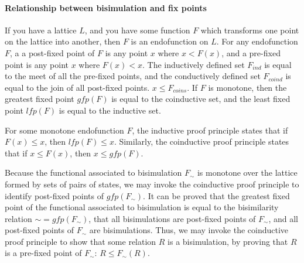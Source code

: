 \paragraph{Relationship between bisimulation and fix points}

If you have a lattice $L$, and you have some 
function $F$ which transforms one point on the lattice into another, then
$F$ is an endofunction on $L$. For any endofunction $F$, a 
a post-fixed point of $F$ is any point $x$ where $x < F(x)$, and a pre-fixed 
point is any point $x$ where $F(x) < x$. The inductively defined set $F_\mathit{ind}$
is equal to the meet of all the pre-fixed points, and the conductively 
defined set $F_\mathit{coind}$ is equal to the join of all post-fixed points. 
$x \leq F_\mathit{coins}$. If $F$ is monotone, then the greatest fixed point $\mathit{gfp}(F)$ 
is equal to the coinductive set, and the least fixed point $\mathit{lfp}(F)$ is equal to the 
inductive set.

For some monotone endofunction $F$, the inductive proof principle states that 
if $F(x) \leq x$, then $\mathit{lfp}(F) \leq x$. Similarly, the coinductive proof 
principle states that if $x \leq F(x)$, then $x \leq \mathit{gfp}(F)$. 

Because the functional associated to bisimulation $F_\sim$ is monotone over 
the lattice formed by sets of pairs of states, we may invoke the coinductive proof principle
to identify post-fixed points of $\mathit{gfp}(F_\sim)$. It can be proved that
the greatest fixed point of the functional associated to 
bisimulation is equal to the bisimilarity relation $\sim = \mathit{gfp}(F_\sim)$, that 
all bisimulations are 
post-fixed points of $F_\sim$, and all post-fixed points of $F_\sim$ are 
bisimulations. Thus, we may invoke the coinductive proof principle to show that some relation $R$ is a bisimulation, by proving that $R$ is a pre-fixed point of $F_\sim$: $R \leq F_\sim(R)$.
 

